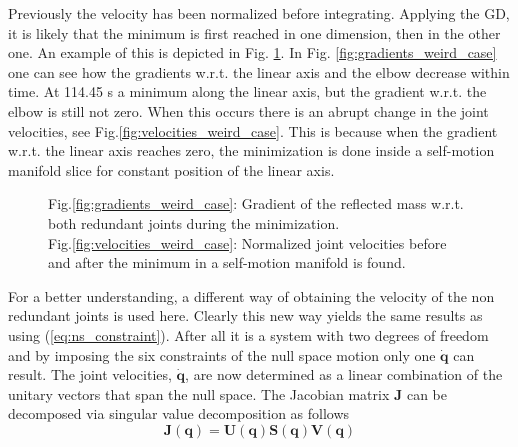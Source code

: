 Previously the velocity has been normalized before integrating. Applying the GD, it is likely that the minimum is first reached in one dimension, then in the other one. An example of this is depicted in Fig. \ref{fig:weird case}. In  Fig. \ref{fig:gradients_weird_case} one can see how the gradients w.r.t. the linear axis %
and the elbow %
decrease within time. At 114.45 s a minimum along the linear axis, but the gradient w.r.t. the elbow is still not zero. When this occurs there is an abrupt change in the joint velocities, see Fig.\ref{fig:velocities_weird_case}.
This is because when the gradient w.r.t. the linear axis %
reaches zero, the minimization is done inside a self-motion manifold slice for constant position of the linear axis.

\begin{figure}[!htb]
	\centering	
	 	 	 	
	\caption{Fig.\ref{fig:gradients_weird_case}: Gradient of the reflected mass w.r.t. both redundant joints during the minimization. \\ Fig.\ref{fig:velocities_weird_case}: Normalized joint velocities before and after the minimum in a self-motion manifold is found. }
	\label{fig:weird case}
\end{figure} 






For a better understanding, a different way of obtaining the velocity of the non redundant joints is used here. Clearly this new way yields the same results as using  (\ref{eq:ns_constraint}). After all it is a system with two degrees of freedom and by imposing the six constraints of the null space motion only one $\mathbf{\dot{q}}$ can result.
The joint velocities, $\dot{\mathbf{q}}$, are now determined as a linear combination of the unitary vectors that span the null space.
The Jacobian matrix $\mathbf{J}$ can be decomposed via singular value decomposition \cite{svd} as follows
\begin{equation}
\mathbf{J}(\mathbf{q})=\mathbf{U}(\mathbf{q}) \mathbf{S}(\mathbf{q}) \mathbf{V}(\mathbf{q})
\label{eq:svd}
\end{equation}

